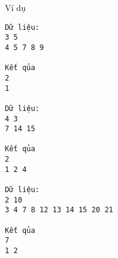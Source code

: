 Ví dụ
\begin{verbatim}
Dữ liệu:
3 5
4 5 7 8 9

Kết qủa
2 
1

Dữ liệu:
4 3
7 14 15

Kết qủa
2
1 2 4

Dữ liệu:
2 10
3 4 7 8 12 13 14 15 20 21

Kết qủa
7
1 2
\end{verbatim}